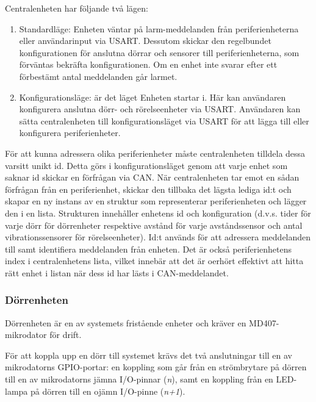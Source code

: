 \documentclass{article}
\begin{document}
Centralenheten har följande två lägen:

\begin{enumerate}
    \item Standardläge: Enheten väntar på larm-meddelanden från periferienheterna eller användarinput via USART. Dessutom skickar den regelbundet  konfigurationen för anslutna dörrar och sensorer till periferienheterna, som förväntas bekräfta konfigurationen. Om en enhet inte svarar efter ett förbestämt antal meddelanden går larmet.
    \item Konfigurationsläge: är det läget Enheten startar i. 
     Här kan användaren konfigurera anslutna dörr- och
 rörelseenheter via USART. Användaren kan sätta centralenheten till konfigurationsläget
      via USART för att lägga till eller konfigurera periferienheter.
\end{enumerate}

För att kunna adressera olika periferienheter måste centralenheten tilldela dessa varsitt unikt id. Detta görs i konfigurationsläget genom att varje enhet som saknar id skickar en förfrågan via CAN. När centralenheten tar emot en sådan förfrågan från en periferienhet, skickar den tillbaka det lägsta lediga id:t och skapar en ny instans av en struktur som representerar periferienheten och lägger den i en lista. Strukturen innehåller enhetens id och konfiguration (d.v.s. tider för varje dörr för dörrenheter respektive avstånd för varje avståndssensor och antal vibrationssensorer för rörelseenheter).
Id:t används för att adressera meddelanden till samt identifiera meddelanden från enheten. Det är också periferienhetens index i centralenhetens lista, vilket innebär att det är oerhört effektivt att hitta rätt enhet i listan när dess id har lästs i CAN-meddelandet.





\subsubsection{Dörrenheten}
\label{subsec:Dörrenheten}

Dörrenheten är en av systemets fristående enheter och kräver en MD407-mikrodator för drift.

För att koppla upp en dörr till systemet krävs det två anslutningar till en av mikrodatorns
 GPIO-portar: en koppling som går från en strömbrytare på dörren till en av mikrodatorns jämna
  I/O-pinnar (\textit{n}), samt en koppling från en LED-lampa på dörren till en ojämn I/O-pinne (\textit{n+1}).
\end{document}
